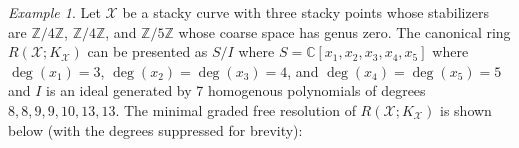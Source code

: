 \documentclass[11pt,reqno]{amsart}
\theoremstyle{remark}
\newtheorem{example}[lemma]{Example}
\newcommand{\cX}{\mathcal{X}}
\newcommand{\C}{\mathbb{C}}
\newcommand{\Z}{\mathbb{Z}}
\begin{document}
\begin{example}
Let $\cX$ be a stacky curve with three stacky points whose stabilizers are $\Z/4\Z$, $\Z/4\Z$, and $\Z/5\Z$ whose coarse space has genus zero. The canonical ring $R(\cX;K_{\cX})$ can be presented as $S/I$ where $S=\C[x_{1},x_{2},x_{3},x_{4},x_{5}]$ where $\deg(x_{1})=3$, $\deg(x_{2})=\deg(x_{3})=4$, and $\deg(x_{4})=\deg(x_{5})=5$ and $I$ is an ideal generated by 7 homogenous polynomials of degrees $8,8,9,9,10,13,13$. The minimal graded free resolution of $R(\cX;K_{\cX})$ is shown below (with the degrees suppressed for brevity):
\begin{center}
\end{center}
\end{example}
%
\end{document}
